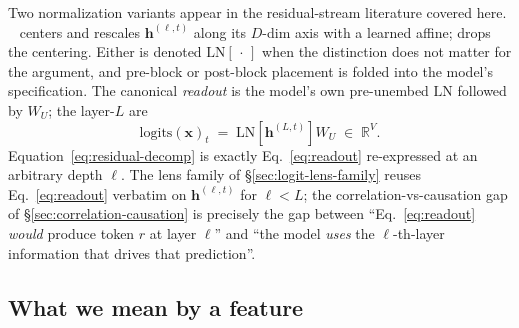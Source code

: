 Two normalization variants appear in the residual-stream literature
covered here. ~\citep{ba2016-layernorm} centers and rescales
$\mathbf{h}^{(\ell, t)}$ along its $D$-dim axis with a learned affine;
 drops the centering. Either is denoted $\mathrm{LN}[\,\cdot\,]$
when the distinction does not matter for the argument, and pre-block
or post-block placement is folded into the model's specification.
The canonical \emph{readout} is the model's own pre-unembed
$\mathrm{LN}$ followed by $W_U$; the layer-$L$  are
\begin{equation}
  \mathrm{logits}(\mathbf{x})_t \;=\; \mathrm{LN}\!\left[\mathbf{h}^{(L, t)}\right] W_U \;\in\;\mathbb{R}^V.
  \label{eq:readout}
\end{equation}
Equation~\eqref{eq:residual-decomp} is exactly Eq.~\eqref{eq:readout}
re-expressed at an arbitrary depth $\ell$. The lens family of
\S\ref{sec:logit-lens-family} reuses Eq.~\eqref{eq:readout} verbatim
on $\mathbf{h}^{(\ell, t)}$ for $\ell < L$; the
correlation-vs-causation gap of \S\ref{sec:correlation-causation}
is precisely the gap between ``Eq.~\eqref{eq:readout} \emph{would}
produce token $r$ at layer $\ell$'' and ``the model \emph{uses} the
$\ell$-th-layer information that drives that prediction''.

\subsection{What we mean by a feature}
\label{sec:substrate-feature}

